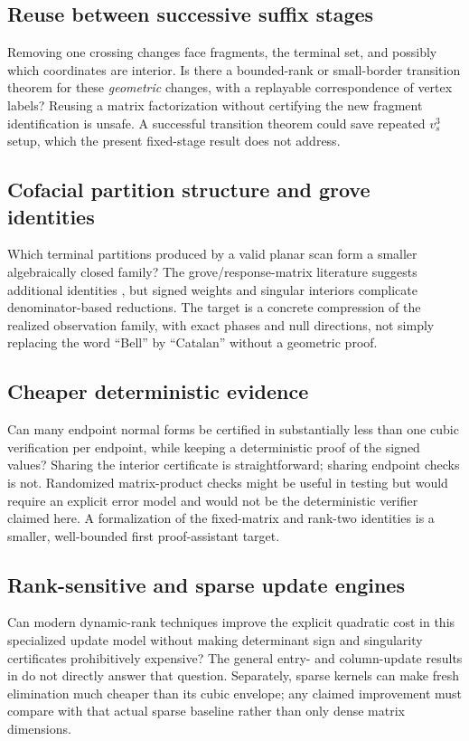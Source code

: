 \documentclass[11pt,letterpaper]{article}
\theoremstyle{definition}\newtheorem{definition}[theorem]{Definition}
\theoremstyle{remark}\newtheorem{remark}[theorem]{Remark}
\begin{document}
\subsection{Reuse between successive suffix stages}
Removing one crossing changes face fragments, the terminal set, and possibly which coordinates are interior. Is there a bounded-rank or small-border transition theorem for these \emph{geometric} changes, with a replayable correspondence of vertex labels? Reusing a matrix factorization without certifying the new fragment identification is unsafe. A successful transition theorem could save repeated $v_s^3$ setup, which the present fixed-stage result does not address.

\subsection{Cofacial partition structure and grove identities}
Which terminal partitions produced by a valid planar scan form a smaller algebraically closed family? The grove/response-matrix literature suggests additional identities \cite{kenyonwilson}, but signed weights and singular interiors complicate denominator-based reductions. The target is a concrete compression of the realized observation family, with exact phases and null directions, not simply replacing the word ``Bell'' by ``Catalan'' without a geometric proof.

\subsection{Cheaper deterministic evidence}
Can many endpoint normal forms be certified in substantially less than one cubic verification per endpoint, while keeping a deterministic proof of the signed values? Sharing the interior certificate is straightforward; sharing endpoint checks is not. Randomized matrix-product checks might be useful in testing but would require an explicit error model and would not be the deterministic verifier claimed here. A formalization of the fixed-matrix and rank-two identities is a smaller, well-bounded first proof-assistant target.

\subsection{Rank-sensitive and sparse update engines}
Can modern dynamic-rank techniques improve the explicit quadratic cost in this specialized update model without making determinant sign and singularity certificates prohibitively expensive? The general entry- and column-update results in \cite{dynamicrank} do not directly answer that question. Separately, sparse kernels can make fresh elimination much cheaper than its cubic envelope; any claimed improvement must compare with that actual sparse baseline rather than only dense matrix dimensions.
\end{document}
